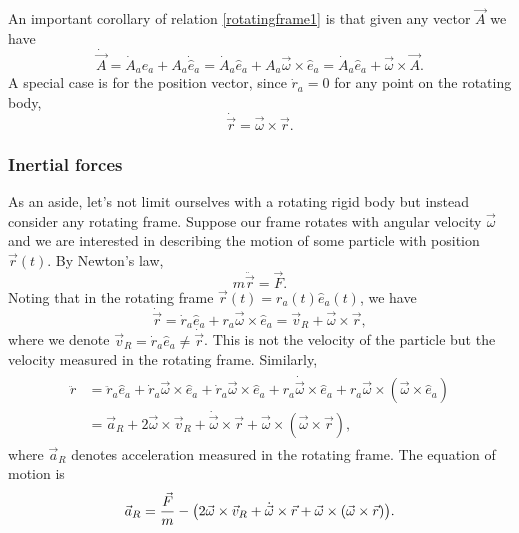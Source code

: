 \documentclass{article}
\begin{document}
\par
An important corollary of relation \eqref{rotatingframe1} is that given any vector $\vec{A}$ we have
\begin{equation}
    \dot{\vec{A}} = \dot{A}_a \hat{e}_a + A_a \dot{\hat{e}}_a = \dot{A}_a \hat{e}_a + A_a \vec{\omega} \times \hat{e}_a = \dot{A}_a \hat{e}_a + \vec{\omega} \times \vec{A}.
\end{equation}
A special case is for the position vector, since $\dot{r}_a = 0$ for any point on the rotating body,
\begin{equation} \label{rotatingframe2}
    \dot{\vec{r}} = \vec{\omega} \times \vec{r}.
\end{equation}
\subsubsection{Inertial forces}
As an aside, let's not limit ourselves with a rotating rigid body but instead consider any rotating frame. Suppose our frame rotates with angular velocity $\vec{\omega}$ and we are interested in describing the motion of some particle with position $\vec{r}(t)$. By Newton's law,
\[
m \ddot{\vec{r}} = \vec{F}.
\]
Noting that in the rotating frame $\vec{r}(t) = r_{a}(t) \hat{e}_{a}(t)$, we have
\begin{equation}
	\dot{\vec{r}}= \dot{r}_{a} \hat{e}_{a} + r_{a} \vec{\omega} \times \hat{e}_{a} = \vec{v}_R + \vec{\omega} \times \vec{r},
\end{equation}
where we denote $ \vec{v}_R = \dot{r}_{a} \hat{e}_{a} \neq \dot{\vec{r}} $. This is not the velocity of the particle but the velocity measured in the rotating frame. Similarly,
\begin{align}
\begin{split}
	\ddot{r} &= \ddot{r}_a \hat{e}_{a} + \dot{r}_{a} \vec{\omega} \times \hat{e}_{a} + \dot{r}_{a} \vec{\omega} \times \hat{e}_{a} + r_{a} \dot{\vec{\omega}} \times \hat{e}_{a} + r_{a} \vec{\omega} \times (\vec{\omega} \times \hat{e}_{a}) \\
	&= \vec{a}_{R} + 2 \vec{\omega} \times \vec{v}_{R} + \dot{\vec{\omega}} \times \vec{r} + \vec{\omega} \times (\vec{\omega} \times \vec{r}),
	\end{split}
\end{align}
where $ \vec{a}_{R} $ denotes acceleration measured in the rotating frame. The equation of motion is
\begin{equation}
	\vec{a}_{R} = \frac{\vec{F}}{m} - \qty(2 \vec{\omega} \times \vec{v}_{R} + \dot{\vec{\omega}} \times \vec{r} + \vec{\omega} \times (\vec{\omega} \times \vec{r})).
\end{equation}
\end{document}
